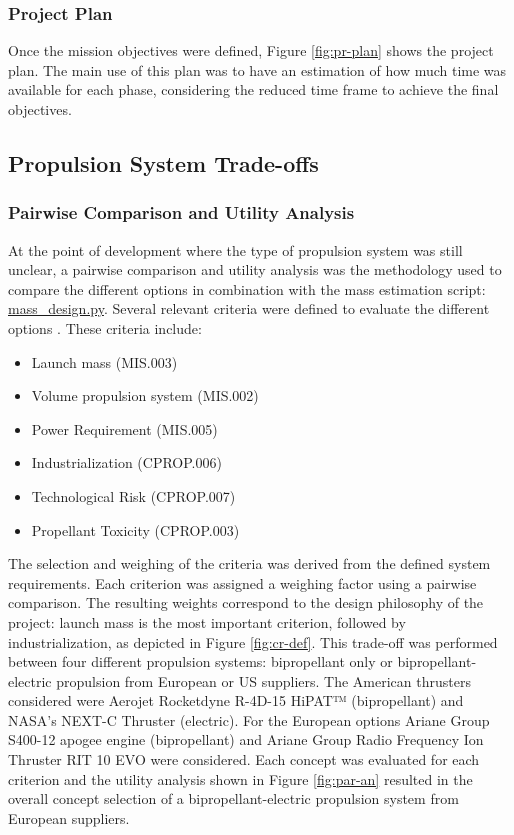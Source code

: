 \subsubsection{Project Plan}
Once the mission objectives were defined, Figure \ref{fig:pr-plan} shows the project plan. The main use of this plan was to have an estimation of how much time was available for each phase, considering the reduced time frame to achieve the final objectives. 

\subsection{Propulsion System Trade-offs}
\subsubsection{Pairwise Comparison and Utility Analysis}

At the point of development where the type of propulsion system was still unclear, a pairwise comparison and utility analysis was the methodology used to compare the different options in combination with the mass estimation script: \href{https://github.com/Sven-J-Steinert/MomenTUM/blob/main/MATLAB/mass_design.m}{\colorbox{codegray}{mass\_design.py}}. Several relevant criteria were defined to evaluate the different options \cite{DesignTradeoffs}. These criteria include:
\begin{itemize}
    \item Launch mass (MIS.003)
    \item Volume propulsion system (MIS.002)
    \item Power Requirement (MIS.005)
    \item Industrialization (CPROP.006)
    \item Technological Risk (CPROP.007)
    \item Propellant Toxicity (CPROP.003)
\end{itemize}	

The selection and weighing of the criteria was derived from the defined system requirements. Each criterion was assigned a weighing factor using a pairwise comparison. The resulting weights correspond to the design philosophy of the project: launch mass is the most important criterion, followed by industrialization, as depicted in Figure \ref{fig:cr-def}. This trade-off was performed between four different propulsion systems: bipropellant only or bipropellant-electric propulsion from European or US suppliers. The American thrusters considered were Aerojet Rocketdyne R-4D-15 HiPAT™ (bipropellant) and NASA’s NEXT-C Thruster (electric). For the European options Ariane Group S400-12 apogee engine (bipropellant) and Ariane Group Radio Frequency Ion Thruster RIT 10 EVO were considered. Each concept was evaluated for each criterion and the utility analysis shown in Figure \ref{fig:par-an} resulted in the overall concept selection of a bipropellant-electric propulsion system from European suppliers.

